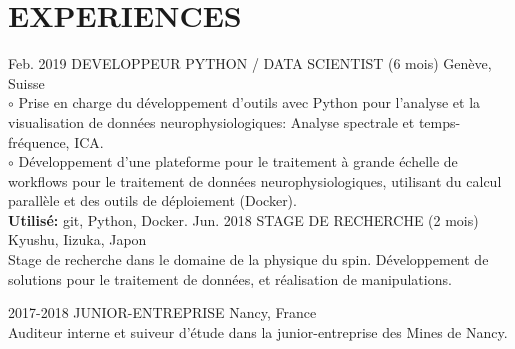 \documentclass[]{cv-style}          %
\begin{document}
\section{EXPERIENCES}
\begin{entrylist}
\entry
  {Feb. 2019}
  {DEVELOPPEUR PYTHON / DATA SCIENTIST (6 mois)}
  {Genève, Suisse}
  {\\
  $\circ$ Prise en charge du développement d'outils avec Python pour l'analyse et la visualisation de données neurophysiologiques: Analyse spectrale et temps-fréquence, ICA.\\
  $\circ$ Développement d'une plateforme pour le traitement à grande échelle de workflows pour le traitement de données neurophysiologiques, utilisant du calcul parallèle et des outils de déploiement (Docker). \\
  \textbf{Utilisé:} git, Python, Docker.
  \vspace{0.2cm}
  }
\entry
  {Jun. 2018}
  {STAGE DE RECHERCHE (2 mois)}
  {Kyushu, Iizuka, Japon}
  {\\
  Stage de recherche dans le domaine de la physique du spin. Développement de solutions pour le traitement de données, et réalisation de manipulations. 
  \vspace{0.2cm}
  }
  
\entry
  {2017-2018}
  {JUNIOR-ENTREPRISE}
  {Nancy, France}
  {\\
  Auditeur interne et suiveur d'étude dans la junior-entreprise des Mines de Nancy.
  \vspace{0.2cm}
  }
\end{entrylist}
%

\newpage
\hphantom\\
\end{document}

